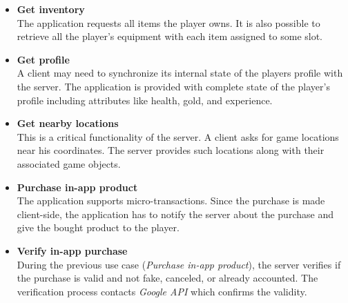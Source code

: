 	\begin{itemize}
		\item \textbf{Get inventory}\\
		The application requests all items the player owns. It is also possible to retrieve all the player's equipment with each item assigned to some slot.
		
		\item \textbf{Get profile}\\
		A client may need to synchronize its internal state of the players profile with the server. The application is provided with complete state of the player's profile including attributes like health, gold, and experience.
		
		
		\item \textbf{Get nearby locations}\\
		This is a critical functionality of the server. A client asks for game locations near his coordinates. The server provides such locations along with their associated game objects.
		
		
		\item \textbf{Purchase in-app product}\\
		The application supports micro-transactions. Since the purchase is made client-side, the application has to notify the server about the purchase and give the bought product to the player. 
		
		
		\item \textbf{Verify in-app purchase}\\
		During the previous use case (\textit{Purchase in-app product}), the server verifies if the purchase is valid and not fake, canceled, or already accounted. The verification process contacts \textit{Google API} which confirms the validity.
		
		
	\end{itemize}
	

